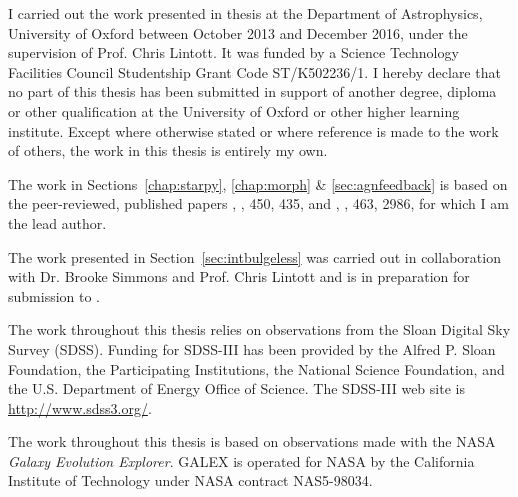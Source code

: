 \documentclass[12pt,useAMS]{ociamthesis}  %
\begin{document}
\begin{originality}
I carried out the work presented in thesis at the Department of Astrophysics, University of Oxford between October 2013 and December 2016, under the supervision of Prof. Chris Lintott. It was funded by a Science Technology Facilities Council Studentship Grant Code ST/K502236/1. I hereby declare that no part of this thesis has been submitted in support of another degree, diploma or other qualification at the University of Oxford or other higher learning institute. Except where otherwise stated or where reference is made to the work of others, the work in this thesis is entirely my own.

The work in Sections~\ref{chap:starpy}, \ref{chap:morph} \& \ref{sec:agnfeedback} is based on the peer-reviewed, published papers \citealt{smethurst15}, \mnras, 450, 435, and \citealt{smethurst16}, \mnras, 463, 2986, for which I am the lead author. 

The work presented in Section~\ref{sec:intbulgeless} was carried out in collaboration with Dr. Brooke Simmons and Prof. Chris Lintott and is in preparation for submission to \mnras.

The work throughout this thesis relies on observations from the Sloan Digital Sky Survey (SDSS). Funding for SDSS-III has been provided by the Alfred P. Sloan Foundation, the Participating Institutions, the National Science Foundation, and the U.S. Department of Energy Office of Science. The SDSS-III web site is \url{http://www.sdss3.org/}.


The work throughout this thesis is based on observations made with the NASA \emph{Galaxy Evolution Explorer}. GALEX is operated for NASA by the California Institute of Technology under NASA contract NAS5-98034.


\end{originality}
\end{document}

